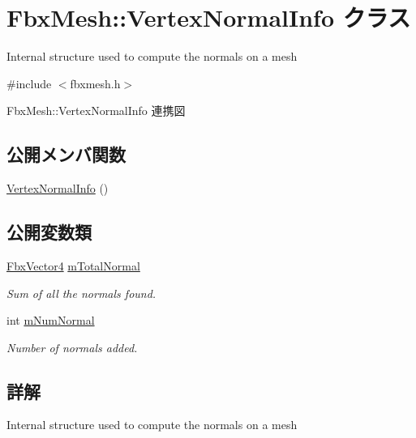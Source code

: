\hypertarget{class_fbx_mesh_1_1_vertex_normal_info}{}\section{Fbx\+Mesh\+:\+:Vertex\+Normal\+Info クラス}
\label{class_fbx_mesh_1_1_vertex_normal_info}


Internal structure used to compute the normals on a mesh  




{\ttfamily \#include $<$fbxmesh.\+h$>$}



Fbx\+Mesh\+:\+:Vertex\+Normal\+Info 連携図
\subsection*{公開メンバ関数}
\begin{DoxyCompactItemize}
\item 
\hyperlink{class_fbx_mesh_1_1_vertex_normal_info_a8050efd1f9e0907b9581c93f49e90888}{Vertex\+Normal\+Info} ()
\end{DoxyCompactItemize}
\subsection*{公開変数類}
\begin{DoxyCompactItemize}
\item 
\hyperlink{class_fbx_vector4}{Fbx\+Vector4} \hyperlink{class_fbx_mesh_1_1_vertex_normal_info_a449e265248253dbb00e7e7d405a3d330}{m\+Total\+Normal}
\begin{DoxyCompactList}\small\item\em Sum of all the normals found. \end{DoxyCompactList}\item 
int \hyperlink{class_fbx_mesh_1_1_vertex_normal_info_abae0bef2c0c2e79be52aae93ca73c666}{m\+Num\+Normal}
\begin{DoxyCompactList}\small\item\em Number of normals added. \end{DoxyCompactList}\end{DoxyCompactItemize}


\subsection{詳解}
Internal structure used to compute the normals on a mesh 

